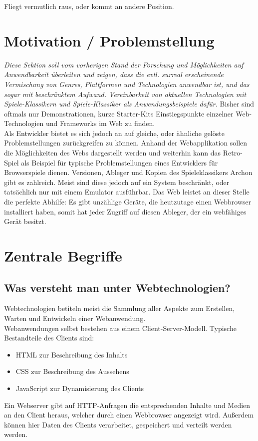 Fliegt vermutlich raus, oder kommt an andere Position.

\section{Motivation / Problemstellung}
\label{sec:motivation}
\emph{ Diese Sektion soll vom vorherigen Stand der Forschung und Möglichkeiten auf Anwendbarkeit überleiten und zeigen, dass die evtl. surreal erscheinende Vermischung von Genres, Plattformen und Technologien anwendbar ist, und das sogar mit beschränktem Aufwand. Vereinbarkeit von aktuellen Technologien mit Spiele-Klassikern und Spiele-Klassiker als Anwendungsbeispiele dafür.}
Bisher sind oftmals nur Demonstrationen, kurze Starter-Kits \bzw Einstiegspunkte einzelner Web-Technologien und Frameworks im Web zu finden.\\
Als Entwickler bietet es sich jedoch an auf gleiche, oder ähnliche gelöste Problemstellungen zurückgreifen zu können.
Anhand der Webapplikation sollen die Möglichkeiten des Webs dargestellt werden und weiterhin kann das Retro-Spiel als Beispiel für typische Problemstellungen eines Entwicklers für Browserspiele dienen.
Versionen, Ableger und Kopien des Spieleklassikers Archon gibt es zahlreich. Meist sind diese jedoch auf ein System beschränkt, oder tatsächlich nur mit einem Emulator ausführbar. Das Web leistet an dieser Stelle die perfekte Abhilfe: Es gibt unzählige Geräte, die heutzutage einen Webbrowser installiert haben, somit hat jeder Zugriff auf diesen Ableger, der ein webfähiges Gerät besitzt.

\section{Zentrale Begriffe}
\label{sec:zentrale_begriffe}

\subsection{Was versteht man unter Webtechnologien?}
Webtechnologien betiteln meist die Sammlung aller Aspekte zum Erstellen, Warten und Entwickeln einer Webanwendung.\\
Webanwendungen selbst bestehen aus einem Client-Server-Modell.
Typische Bestandteile des Clients sind: 
\begin{itemize}
	\item HTML zur Beschreibung des Inhalts
	\item CSS zur Beschreibung des Aussehens
	\item JavaScript zur Dynamisierung des Clients
\end{itemize}
Ein Webserver gibt auf HTTP-Anfragen die entsprechenden Inhalte und Medien an den Client heraus, welcher durch einen Webbrowser angezeigt wird. Außerdem können hier Daten des Clients verarbeitet, gespeichert und verteilt werden werden.
